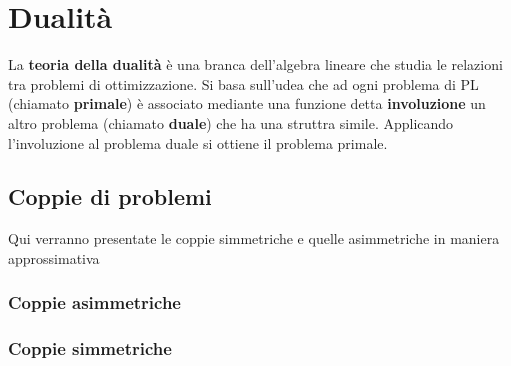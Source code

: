   


\section{Dualità}

La \textbf{teoria della dualità} è  una branca dell'algebra lineare che studia le relazioni tra problemi di ottimizzazione. Si basa sull'udea che ad ogni problema di PL (chiamato \textbf{primale}) è associato mediante una funzione detta \textbf{involuzione} un altro problema (chiamato \textbf{duale}) che ha una struttra simile. Applicando l'involuzione al problema duale si ottiene il problema primale. 

\subsection{Coppie di problemi}

Qui verranno presentate le coppie simmetriche e quelle asimmetriche in maniera approssimativa
\subsubsection{Coppie asimmetriche}

\subsubsection{Coppie simmetriche}

